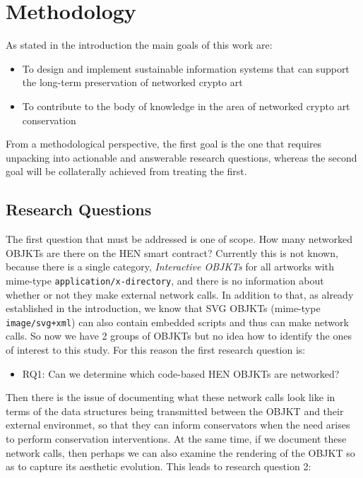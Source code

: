 \chapter{Methodology}

As stated in the introduction the main goals of this work are:

\begin{itemize}
	\item To design and implement sustainable information systems that can support the long-term preservation of networked crypto art
	\item To contribute to the body of knowledge in the area of networked crypto art conservation
\end{itemize}

From a methodological perspective, the first goal is the one that requires unpacking into actionable and answerable research questions, whereas the second goal will be collaterally achieved from treating the first.

\section{Research Questions}

The first question that must be addressed is one of scope. How many networked OBJKTs are there on the HEN smart contract? Currently this is not known, because there is a single category, \emph{Interactive OBJKTs} for all artworks with mime-type \texttt{application/x-directory}, and there is no information about whether or not they make external network calls. In addition to that, as already established in the introduction, we know that SVG OBJKTs (mime-type \texttt{image/svg+xml}) can also contain embedded scripts and thus can make network calls. So now we have 2 groups of OBJKTs but no idea how to identify the ones of interest to this study. For this reason the first research question is:

\begin{itemize}
	\item RQ1: Can we determine which code-based HEN OBJKTs are networked?
\end{itemize}

Then there is the issue of documenting what these network calls look like in terms of the data structures being transmitted between the OBJKT and their external environmet, so that they can inform conservators when the need arises to perform conservation interventions. At the same time, if we document these network calls, then perhaps we can also examine the rendering of the OBJKT so as to capture its aesthetic evolution. This leads to research question 2:

